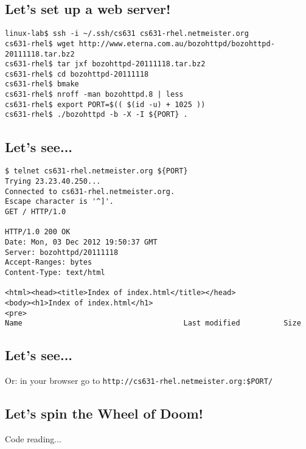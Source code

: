 \documentclass[xga]{xdvislides}
\begin{document}
\subsection{Let's set up a web server!}

\begin{verbatim}
linux-lab$ ssh -i ~/.ssh/cs631 cs631-rhel.netmeister.org
cs631-rhel$ wget http://www.eterna.com.au/bozohttpd/bozohttpd-20111118.tar.bz2
cs631-rhel$ tar jxf bozohttpd-20111118.tar.bz2
cs631-rhel$ cd bozohttpd-20111118
cs631-rhel$ bmake
cs631-rhel$ nroff -man bozohttpd.8 | less
cs631-rhel$ export PORT=$(( $(id -u) + 1025 ))
cs631-rhel$ ./bozohttpd -b -X -I ${PORT} .
\end{verbatim}


\subsection{Let's see...}

\begin{verbatim}
$ telnet cs631-rhel.netmeister.org ${PORT}
Trying 23.23.40.250...
Connected to cs631-rhel.netmeister.org.
Escape character is '^]'.
GET / HTTP/1.0

HTTP/1.0 200 OK
Date: Mon, 03 Dec 2012 19:50:37 GMT
Server: bozohttpd/20111118
Accept-Ranges: bytes
Content-Type: text/html

<html><head><title>Index of index.html</title></head>
<body><h1>Index of index.html</h1>
<pre>
Name                                     Last modified          Size
\end{verbatim}

\subsection{Let's see...}

Or: in your browser go to {\tt http://cs631-rhel.netmeister.org:\${PORT}/}

\subsection{Let's spin the Wheel of Doom!}

Code reading...
\end{document}
